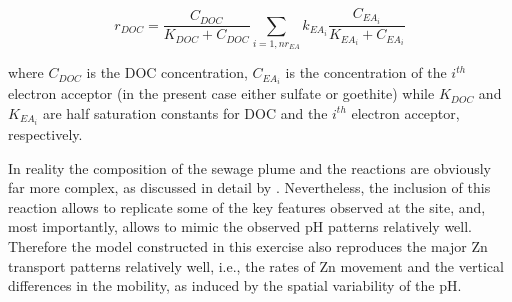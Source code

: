 \begin{equation}
r_{DOC} = \frac{C_{DOC}}{K_{DOC} + C_{DOC}} \sum_{i=1,nr_{EA}}{k_{EA_i} \frac{C_{EA_i}}{K_{EA_i} + C_{EA_i}}} 
\label{eq:doc_deg}
\end{equation}

where $C_{DOC}$ is the DOC concentration, $C_{EA_i}$ is the concentration of the $i^{th}$
electron acceptor (in the present case either sulfate or goethite) while $K_{DOC}$ and $K_{EA_i}$
are half saturation constants for DOC and the $i^{th}$
electron acceptor, respectively.

\par In reality the composition of the sewage plume and the 
reactions are obviously far more complex, as discussed in 
detail by \cite{Kent20003411}.
Nevertheless, the inclusion of this reaction allows to replicate
some of the key features observed at the site, and, most importantly,
allows to mimic the observed pH patterns relatively well.
Therefore the model constructed in this exercise also reproduces
the major Zn transport patterns relatively well, i.e., the rates 
of Zn movement and the vertical differences in the mobility, as induced
by the spatial variability of the pH.  

